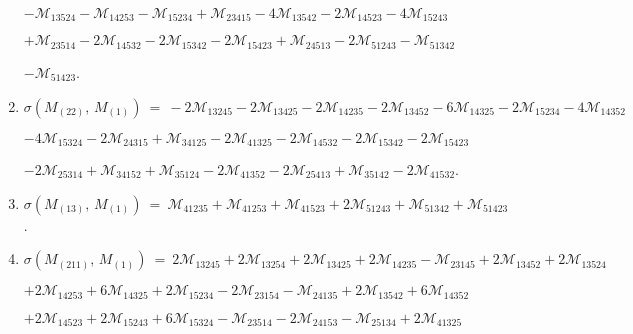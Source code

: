\documentclass[12pt]{article}
\newcommand{\M}{\mathcal{M}}
\begin{document}
\begin{enumerate}
      \hspace{10pt}
      $-\M_{13524} 
       -\M_{14253} -\M_{15234} 
       +\M_{23415} -4\M_{13542} 
       -2\M_{14523} -4\M_{15243} $\vspace{-6pt}

      \hspace{10pt}
      $+\M_{23514} -2\M_{14532} 
       -2\M_{15342} -2\M_{15423} 
       +\M_{24513} -2\M_{51243} 
       -\M_{51342} $\vspace{-6pt}

      \hspace{10pt}
      $-\M_{51423} $.\vspace{-8pt}
\item[]\hspace{-50pt}$\sigma(M_{(22)},\,M_{(1)})\ =\ 
        -2\M_{13245} -2\M_{13425} 
       -2\M_{14235} -2\M_{13452} 
       -6\M_{14325} -2\M_{15234} 
       -4\M_{14352} $\vspace{-6pt}

      \hspace{10pt}
      $-4\M_{15324} 
       -2\M_{24315} +\M_{34125} 
       -2\M_{41325} -2\M_{14532} 
       -2\M_{15342} -2\M_{15423} $\vspace{-6pt}

      \hspace{10pt}
      $-2\M_{25314} +\M_{34152} 
       +\M_{35124} -2\M_{41352} 
       -2\M_{25413} +\M_{35142} 
       -2\M_{41532} $.\vspace{-8pt}
\item[]\hspace{-50pt}$\sigma(M_{(13)},\,M_{(1)})\ =\ 
        \M_{41235} +\M_{41253} 
       +\M_{41523} +2\M_{51243} 
       +\M_{51342} +\M_{51423} $.\vspace{-8pt}
\item[]\hspace{-50pt}$\sigma(M_{(211)},\,M_{(1)})\ =\ 
        2\M_{13245} +2\M_{13254} 
       +2\M_{13425} +2\M_{14235} 
       -\M_{23145} +2\M_{13452} 
       +2\M_{13524} $\vspace{-6pt}

      \hspace{10pt}
      $+2\M_{14253} 
       +6\M_{14325} +2\M_{15234} 
       -2\M_{23154} -\M_{24135} 
       +2\M_{13542} +6\M_{14352} $\vspace{-6pt}

      \hspace{10pt}
      $+2\M_{14523} +2\M_{15243} 
       +6\M_{15324} -\M_{23514} 
       -2\M_{24153} -\M_{25134} 
       +2\M_{41325} $\vspace{-6pt}


\end{enumerate}
\end{document}
